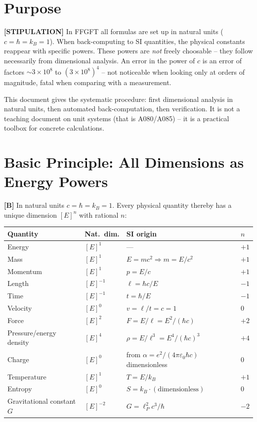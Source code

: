 \section{Purpose}

\textbf{[STIPULATION]} In FFGFT all formulas are set up in natural units
($c=\hbar=k_B=1$). When back-computing to SI quantities, the physical constants
reappear with specific powers. These powers are \emph{not} freely choosable --
they follow necessarily from dimensional analysis. An error in the power of $c$
is an error of factors $\sim3\times10^8$ to $(3\times10^8)^4$ -- not noticeable
when looking only at orders of magnitude, fatal when comparing with a measurement.

This document gives the systematic procedure: first dimensional analysis in
natural units, then automated back-computation, then verification. It is not a
teaching document on unit systems (that is A080/A085) -- it is a practical
toolbox for concrete calculations.

\section{Basic Principle: All Dimensions as Energy Powers}

\textbf{[B]} In natural units $c=\hbar=k_B=1$. Every physical quantity thereby
has a unique dimension $[E]^n$ with rational $n$:

\begin{center}
\renewcommand{\arraystretch}{1.35}
{\small
\begin{tabular}{llll}
\toprule
Quantity & Nat.\ dim. & SI origin & $n$ \\
\midrule
Energy & $[E]^1$ & --- & $+1$ \\
Mass & $[E]^1$ & $E=mc^2\Rightarrow m=E/c^2$ & $+1$ \\
Momentum & $[E]^1$ & $p=E/c$ & $+1$ \\
Length & $[E]^{-1}$ & $\ell=\hbar c/E$ & $-1$ \\
Time & $[E]^{-1}$ & $t=\hbar/E$ & $-1$ \\
Velocity & $[E]^0$ & $v=\ell/t=c=1$ & $0$ \\
Force & $[E]^2$ & $F=E/\ell=E^2/(\hbar c)$ & $+2$ \\
Pressure/energy density & $[E]^4$ & $\rho=E/\ell^3=E^4/(\hbar c)^3$ & $+4$ \\
Charge & $[E]^0$ & from $\alpha=e^2/(4\pi\varepsilon_0\hbar c)$ dimensionless & $0$ \\
Temperature & $[E]^1$ & $T=E/k_B$ & $+1$ \\
Entropy & $[E]^0$ & $S=k_B\cdot(\text{dimensionless})$ & $0$ \\
Gravitational constant $G$ & $[E]^{-2}$ & $G=\ell_P^2c^3/\hbar$ & $-2$ \\
\bottomrule
\end{tabular}
}
\renewcommand{\arraystretch}{1.0}
\end{center}

